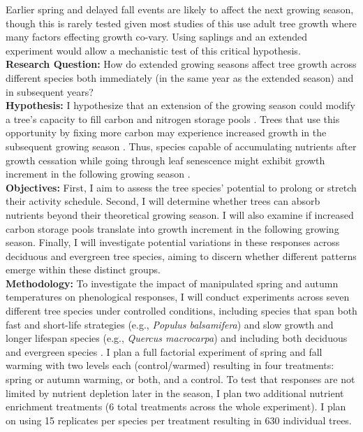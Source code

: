 \documentclass{article}
\begin{document}
Earlier spring and delayed fall events are likely to affect the next growing season, though this is rarely tested given most studies of this use adult tree growth where many factors effecting growth co-vary. Using saplings and an extended experiment would allow a mechanistic test of this critical hypothesis. \\  %
\textbf {Research Question:} How do extended growing seasons affect tree growth across different species both immediately (in the same year as the extended season) and in subsequent years? \\
\textbf {Hypothesis:} I hypothesize that an extension of the growing season could modify a tree’s capacity to fill carbon and nitrogen storage pools \citep{chapin_ecology_1990, lawrence_variable_2018}. Trees that use this opportunity by fixing more carbon may experience increased growth in the subsequent growing season \citep{landhausser_partitioning_2012, martens_first-year_2007}. Thus, species capable of accumulating nutrients after growth cessation while going through leaf senescence might exhibit growth increment in the following growing season \citep{schott_premature_2013}. \\
\textbf {Objectives:} First, I aim to assess the tree species' potential to prolong or stretch their activity schedule. Second, I will determine whether trees can absorb nutrients beyond their theoretical growing season. I will also examine if increased carbon storage pools translate into growth increment in the following growing season. Finally, I will investigate potential variations in these responses across deciduous and evergreen tree species, aiming to discern whether different patterns emerge within these distinct groups.\\
\textbf {Methodology:} To investigate the impact of manipulated spring and autumn temperatures on phenological responses, I will conduct experiments across seven different tree species under controlled conditions, including species that span both fast and short-life strategies (e.g., \emph{Populus balsamifera}) and slow growth and longer lifespan species (e.g., \emph{Quercus macrocarpa}) and including both deciduous and evergreen species \citep{jonsson_annual_2010}. I plan a full factorial experiment of spring and fall warming with two levels each (control/warmed) resulting in four treatments: spring or autumn warming, or both, and a control. To test that responses are not limited by nutrient depletion later in the season, I plan two additional nutrient enrichment treatments (6 total treatments across the whole experiment). I plan on using 15 replicates per species per treatment \citep{siegel_collaborative_2009} resulting in 630 individual trees. %
\end{document}
